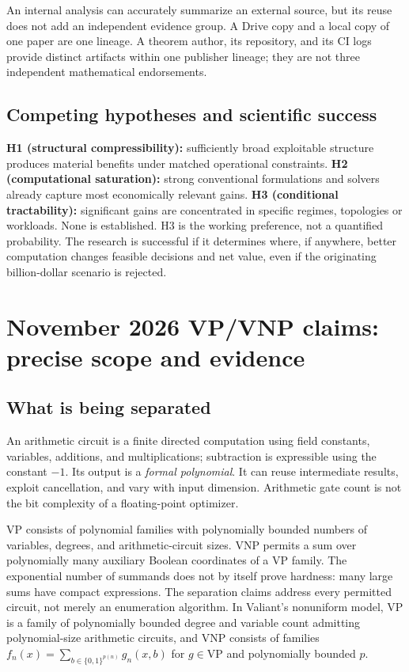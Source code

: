 \documentclass[11pt,letterpaper]{article}
\begin{document}
An internal analysis can accurately summarize an external source, but its reuse does not add an independent evidence group. A Drive copy and a local copy of one paper are one lineage. A theorem author, its repository, and its CI logs provide distinct artifacts within one publisher lineage; they are not three independent mathematical endorsements.

\subsection{Competing hypotheses and scientific success}
\textbf{H1 (structural compressibility):} sufficiently broad exploitable structure produces material benefits under matched operational constraints. \textbf{H2 (computational saturation):} strong conventional formulations and solvers already capture most economically relevant gains. \textbf{H3 (conditional tractability):} significant gains are concentrated in specific regimes, topologies or workloads. None is established. H3 is the working preference, not a quantified probability. The research is successful if it determines where, if anywhere, better computation changes feasible decisions and net value, even if the originating billion-dollar scenario is rejected.

\section{November 2026 VP/VNP claims: precise scope and evidence}
\label{sec:vp}
\subsection{What is being separated}
An arithmetic circuit is a finite directed computation using field constants, variables, additions, and multiplications; subtraction is expressible using the constant $-1$. Its output is a \emph{formal polynomial}. It can reuse intermediate results, exploit cancellation, and vary with input dimension. Arithmetic gate count is not the bit complexity of a floating-point optimizer.

VP consists of polynomial families with polynomially bounded numbers of variables, degrees, and arithmetic-circuit sizes. VNP permits a sum over polynomially many auxiliary Boolean coordinates of a VP family. The exponential number of summands does not by itself prove hardness: many large sums have compact expressions. The separation claims address every permitted circuit, not merely an enumeration algorithm. In Valiant's nonuniform model, VP is a family of polynomially bounded degree and variable count admitting polynomial-size arithmetic circuits, and VNP consists of families $f_n(x)=\sum_{b\in\{0,1\}^{p(n)}}g_n(x,b)$ for $g\in\mathrm{VP}$ and polynomially bounded $p$.\cite{valiant}
\end{document}
